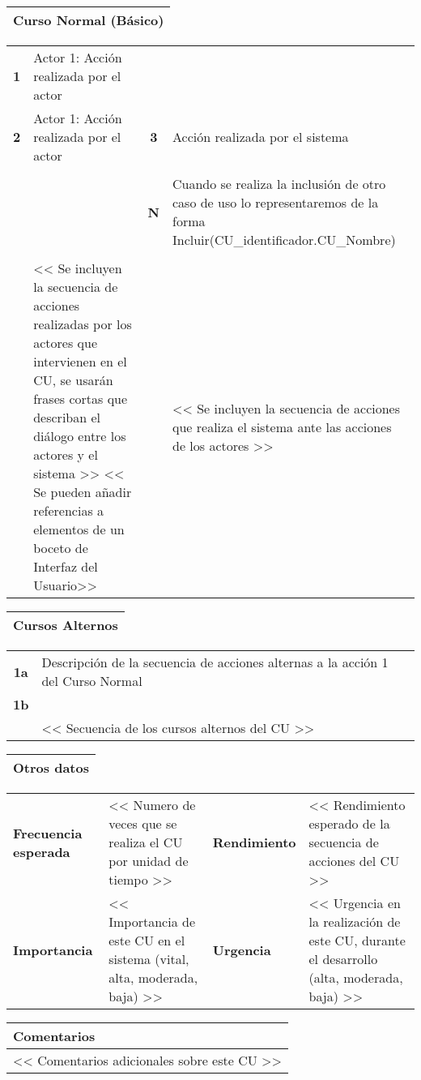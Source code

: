 \begin{table}[H]
	\begin{tabularx}{\textwidth}{X}
		\textbf{Curso Normal (Básico)}\\ \hline
	\end{tabularx}
	\begin{tabularx}{\textwidth}{cXcX}
		\textbf{1} & Actor 1: Acción realizada por el actor & & \\
		\textbf{2} & Actor 1: Acción realizada por el actor & \textbf{3} & Acción realizada por el sistema \\
		 & & & \\
		 & & \textbf{N} &  Cuando se realiza la inclusión de otro caso de uso lo representaremos de la forma Incluir(CU\_identificador.CU\_Nombre)\\
		 & & & \\
		 & << Se incluyen la secuencia de acciones realizadas por los actores que intervienen en el CU, se usarán frases cortas que describan el diálogo entre los actores y el sistema >> << Se pueden añadir referencias a elementos de un boceto de Interfaz del Usuario>> & & << Se incluyen la secuencia de acciones que realiza el sistema ante las acciones de los actores >>
	\end{tabularx}
	
	\begin{tabularx}{\textwidth}{X}
		\textbf{Cursos Alternos}\\ \hline
	\end{tabularx}
	\begin{tabularx}{\textwidth}{cX}
		\textbf{1a} & Descripción de la secuencia de acciones alternas a la acción 1 del Curso Normal\\
		\textbf{1b} & \\
		 & << Secuencia de los cursos alternos del CU >>
	\end{tabularx}
\end{table}

\begin{table}[H]
	\begin{tabularx}{\textwidth}{X}
		\textbf{Otros datos}\\ \hline
	\end{tabularx}
	\begin{tabularx}{\textwidth}{lXlX}
		\textbf{Frecuencia esperada} & << Numero de veces que se realiza el CU por unidad de tiempo >> & \textbf{Rendimiento} & << Rendimiento esperado de la secuencia de acciones del CU >>\\
		\textbf{Importancia} & << Importancia de este CU en el sistema (vital, alta, moderada, baja) >> & \textbf{Urgencia} & << Urgencia en la realización de este CU, durante el desarrollo (alta, moderada, baja) >>\\
	\end{tabularx}
	
	\begin{tabularx}{\textwidth}{X}
		\textbf{Comentarios}\\ \hline
		<< Comentarios adicionales sobre este CU >>
	\end{tabularx}
\end{table}